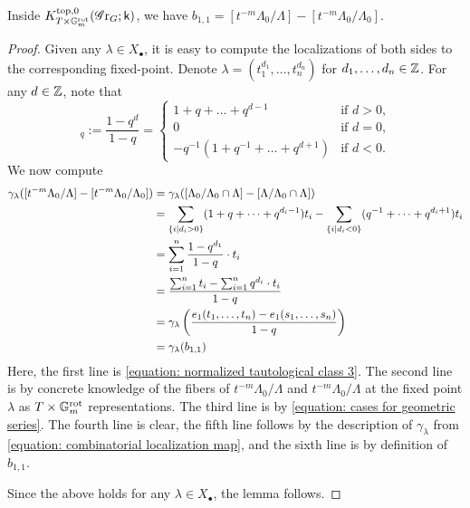 \begin{lemma}
Inside $K^{\mathrm{top}, 0}_{T \times \mathbb{G}_m^{\mathrm{rot}}}(\operatorname{\mathscr{G}r}_G; \mathsf{k})$, we have $b_{1,1} = [t^{-m}\Lambda_0 / \Lambda] - [t^{-m}\Lambda_0 / \Lambda_0]$.
\end{lemma}
\begin{proof}
Given any $\lambda \in X_{\bullet}$, it is easy to compute the localizations of both sides to the corresponding fixed-point. Denote $\lambda = (t_1^{d_1}, \dots, t_n^{d_n})$ for $d_1, \dots, d_n \in \operatorname{\mathbb{Z}}$.
%
For any $d \in \operatorname{\mathbb{Z}}$, note that
\begin{equation}
[d]_q := \frac{1-q^d}{1-q} =   
\begin{cases}\label{equation: cases for geometric series}
1 + q + \dots + q^{d-1} & \text{if $d > 0$,} \\
0 & \text{if $d = 0$,} \\
-q^{-1}( 1 + q^{-1} + \dots + q^{d+1}) & \text{if $d < 0$.}
\end{cases}
\end{equation}
We now compute
\begin{align*}
\gamma_{\lambda}([t^{-m}\Lambda_0 / \Lambda] - [t^{-m}\Lambda_0 / \Lambda_0])
&= \gamma_{\lambda}([\Lambda_0 / \Lambda_0 \cap \Lambda] - [\Lambda / \Lambda_0 \cap \Lambda]) \\
&= \sum_{\{i \mid d_i > 0\}} (1+q+ \dots + q^{d_i-1})t_i - \sum_{\{i \mid d_i < 0\}} (q^{-1}+ \dots + q^{d_i+1})t_i \\
&= \sum_{i=1}^n \frac{1-q^{d_1}}{1-q} \cdot t_i \\
&= \frac{\sum_{i=1}^n t_i - \sum_{i=1}^n q^{d_i} \cdot t_i}{1-q} \\
& =\gamma_{\lambda} \left( \frac{e_1(t_1, \dots, t_n) - e_1(s_1, \dots, s_n)}{1-q} \right)\\
&=\gamma_{\lambda}(b_{1,1}) 
\end{align*}
Here, the first line is \eqref{equation: normalized tautological class 3}. The second line is by concrete knowledge of the fibers of $t^{-m}\Lambda_0 / \Lambda$ and $t^{-m}\Lambda_0 / \Lambda$ at the fixed point $\lambda$ as $T \times \mathbb{G}_m^{\mathrm{rot}}$ representations. The third line is by \eqref{equation: cases for geometric series}. The fourth line is clear, the fifth line follows by the description of $\gamma_{\lambda}$ from \eqref{equation: combinatorial localization map}, and the sixth line is by definition of $b_{1,1}$.

Since the above holds for any $\lambda \in X_{\bullet}$, the lemma follows.
\end{proof}

